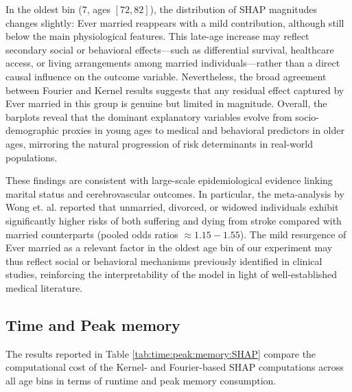\documentclass[letterpaper,11pt]{article}
\numberwithin{equation}{section}
\numberwithin{equation}{section}
\begin{document}
In the oldest bin (7, ages $[72,82]$), the distribution of SHAP magnitudes changes slightly: Ever married reappears with a mild contribution, although still below the main physiological features. This late-age increase may reflect secondary social or behavioral effects—such as differential survival, healthcare access, or living arrangements among married individuals—rather than a direct causal influence on the outcome variable. Nevertheless, the broad agreement between Fourier and Kernel results suggests that any residual effect captured by Ever married in this group is genuine but limited in magnitude. Overall, the barplots reveal that the dominant explanatory variables evolve from socio-demographic proxies in young ages to medical and behavioral predictors in older ages, mirroring the natural progression of risk determinants in real-world populations.

These findings are consistent with large-scale epidemiological evidence linking marital status and cerebrovascular outcomes. In particular, the meta-analysis by Wong et. al. \cite{Wong2018} reported that unmarried, divorced, or widowed individuals exhibit significantly higher risks of both suffering and dying from stroke compared with married counterparts (pooled odds ratios $\approx 1.15-1.55$). The mild resurgence of Ever married as a relevant factor in the oldest age bin of our experiment may thus reflect social or behavioral mechanisms previously identified in clinical studies, reinforcing the interpretability of the model in light of well-established medical literature.

\subsection{Time and Peak memory}

The results reported in Table \ref{tab:time:peak:memory:SHAP} compare the computational cost of the Kernel- and Fourier-based SHAP computations across all age bins in terms of runtime and peak memory consumption.
\end{document}
